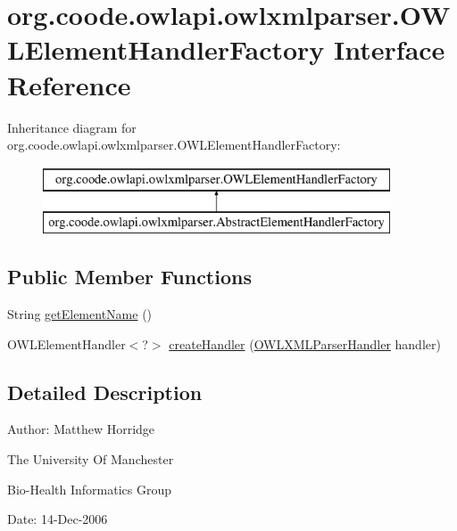 \hypertarget{interfaceorg_1_1coode_1_1owlapi_1_1owlxmlparser_1_1_o_w_l_element_handler_factory}{\section{org.\-coode.\-owlapi.\-owlxmlparser.\-O\-W\-L\-Element\-Handler\-Factory Interface Reference}
\label{interfaceorg_1_1coode_1_1owlapi_1_1owlxmlparser_1_1_o_w_l_element_handler_factory}
}
Inheritance diagram for org.\-coode.\-owlapi.\-owlxmlparser.\-O\-W\-L\-Element\-Handler\-Factory\-:\begin{figure}[H]
\begin{center}
\leavevmode
\includegraphics[height=2.000000cm]{interfaceorg_1_1coode_1_1owlapi_1_1owlxmlparser_1_1_o_w_l_element_handler_factory}
\end{center}
\end{figure}
\subsection*{Public Member Functions}
\begin{DoxyCompactItemize}
\item 
String \hyperlink{interfaceorg_1_1coode_1_1owlapi_1_1owlxmlparser_1_1_o_w_l_element_handler_factory_afdc618bc9802955d9bfbd928fe707464}{get\-Element\-Name} ()
\item 
O\-W\-L\-Element\-Handler$<$?$>$ \hyperlink{interfaceorg_1_1coode_1_1owlapi_1_1owlxmlparser_1_1_o_w_l_element_handler_factory_a4bf263770664a1d476f77b04bfe05bad}{create\-Handler} (\hyperlink{classorg_1_1coode_1_1owlapi_1_1owlxmlparser_1_1_o_w_l_x_m_l_parser_handler}{O\-W\-L\-X\-M\-L\-Parser\-Handler} handler)
\end{DoxyCompactItemize}


\subsection{Detailed Description}
Author\-: Matthew Horridge\par
 The University Of Manchester\par
 Bio-\/\-Health Informatics Group\par
 Date\-: 14-\/\-Dec-\/2006\par
\par
 

